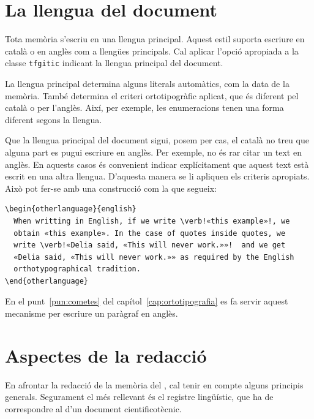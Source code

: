 \documentclass{tfgitic}
\begin{document}
\chapter{La llengua del document}

Tota memòria s'escriu en una llengua principal. Aquest estil suporta
escriure en català o en anglès com a llengües principals. Cal aplicar
l'opció apropiada a la classe \texttt{tfgitic} indicant la llengua
principal del document.

La llengua principal determina alguns literals automàtics, com la data
de la memòria. També determina el criteri ortotipogràfic aplicat, que
és diferent pel català o per l'anglès. Així, per exemple, les
enumeracions tenen una forma diferent segons la llengua.

Que la llengua principal del document sigui, posem per cas, el català
no treu que alguna part es pugui escriure en anglès. Per exemple, no
és rar citar un text en anglès. En aquests casos és convenient indicar
explícitament que aquest text està escrit en una altra
llengua. D'aquesta manera se li apliquen els criteris apropiats. Això
pot fer-se amb una construcció com la que segueix:
\begin{verbatim}
\begin{otherlanguage}{english}
  When writting in English, if we write \verb!«this example»!, we
  obtain «this example». In the case of quotes inside quotes, we
  write \verb!«Delia said, «This will never work.»»!  and we get
  «Delia said, «This will never work.»» as required by the English
  orthotypographical tradition.
\end{otherlanguage}
\end{verbatim}

En el punt~\ref{pun:cometes} del capítol~\ref{cap:ortotipografia} es
fa servir aquest mecanisme per escriure un paràgraf en anglès.

\chapter{Aspectes de la redacció}

En afrontar la redacció de la memòria del , cal tenir en
compte alguns principis generals. Segurament el més rellevant és el
registre lingüístic, que ha de correspondre al d'un document
cientificotècnic.
\end{document}

